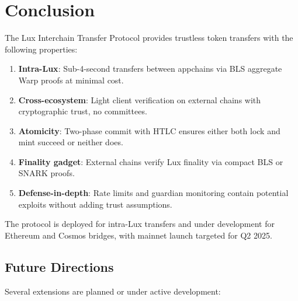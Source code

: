\section{Conclusion}
\label{sec:conclusion}

The Lux Interchain Transfer Protocol provides trustless token transfers with the following properties:

\begin{enumerate}
    \item \textbf{Intra-Lux}: Sub-4-second transfers between appchains via BLS aggregate Warp proofs at minimal cost.
    \item \textbf{Cross-ecosystem}: Light client verification on external chains with cryptographic trust, no committees.
    \item \textbf{Atomicity}: Two-phase commit with HTLC ensures either both lock and mint succeed or neither does.
    \item \textbf{Finality gadget}: External chains verify Lux finality via compact BLS or SNARK proofs.
    \item \textbf{Defense-in-depth}: Rate limits and guardian monitoring contain potential exploits without adding trust assumptions.
\end{enumerate}

The protocol is deployed for intra-Lux transfers and under development for Ethereum and Cosmos bridges, with mainnet launch targeted for Q2 2025.

\subsection{Future Directions}

Several extensions are planned or under active development:

